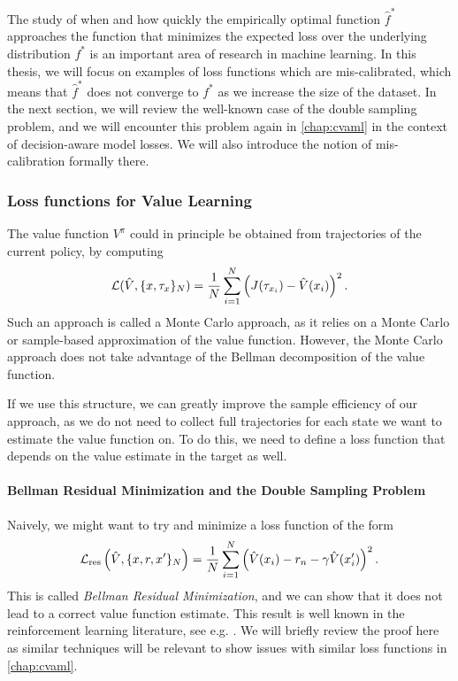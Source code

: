 The study of when and how quickly the empirically optimal function $\hat{f}^*$ approaches the function that minimizes the expected loss over the underlying distribution $f^*$ is an important area of research in machine learning.
In this thesis, we will focus on examples of loss functions which are mis-calibrated, which means that $\hat{f}^*$ does not converge to $f^*$ as we increase the size of the dataset.
In the next section, we will review the well-known case of the double sampling problem, and we will encounter this problem again in \autoref{chap:cvaml} in the context of decision-aware model losses.
We will also introduce the notion of mis-calibration formally there.

\subsubsection{Loss functions for Value Learning}
The value function $V^\pi$ could in principle be obtained from trajectories of the current policy, by computing $$\mathcal{L}(\hat{V}, \{x, \tau_{x}\}_N) = \frac{1}{N} \sum_{i=1}^N \left(J(\tau_{x_i}) - \hat{V}(x_i)\right)^2.$$
Such an approach is called a Monte Carlo approach, as it relies on a Monte Carlo or sample-based approximation of the value function.
However, the Monte Carlo approach does not take advantage of the Bellman decomposition of the value function.

If we use this structure, we can greatly improve the sample efficiency of our approach, as we do not need to collect full trajectories for each state we want to estimate the value function on.
To do this, we need to define a loss function that depends on the value estimate in the target as well.

\paragraph{Bellman Residual Minimization and the Double Sampling Problem}
Naively, we might want to try and minimize a loss function of the form
$$\mathcal{L}_\mathrm{res}\left(\hat{V}, \{x, r, x'\}_{N}\right) = \frac{1}{N} \sum_{i=1}^N \left(\hat{V}(x_i) - r_n - \gamma \hat{V}(x'_i)\right)^2.$$
This is called \emph{Bellman Residual Minimization}, and we can show that it does not lead to a correct value function estimate.
This result is well known in the reinforcement learning literature, see e.g. \textcite[p. 299]{suttonbook}.
We will briefly review the proof here as similar techniques will be relevant to show issues with similar loss functions in \autoref{chap:cvaml}.


